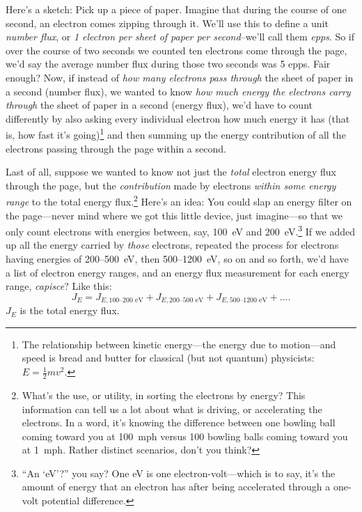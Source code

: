 Here's a sketch: Pick up a piece of paper. Imagine that during the course of one
second, an electron comes zipping through it. We'll use this to define a unit
\emph{number flux}, or \emph {1 electron per sheet of paper per second}--we'll
call them \emph{epps}. So if over the course of two seconds we counted ten
electrons come through the page, we'd say the average number flux during those
two seconds was 5 epps. Fair enough?  Now, if instead of \emph{how many
  electrons pass through} the sheet of paper in a second (number flux), we
wanted to know \emph{how much energy the electrons carry through} the sheet of
paper in a second (energy flux), we'd have to count differently by also asking
every individual electron how much energy it has (that is, how fast it's
going)\footnote{The relationship between kinetic energy---the energy due to
  motion---and speed is bread and butter for classical (but not quantum)
  physicists: $E = \frac{1}{2}m v^2.$} and then summing up the energy
contribution of all the electrons passing through the page within a second.

Last of all, suppose we wanted to know not just the \emph{total} electron energy
flux through the page, but the \emph{contribution} made by electrons
\emph{within some energy range} to the total energy flux.\footnote{What's the
  use, or utility, in sorting the electrons by energy? This information can tell
  us a lot about what is driving, or accelerating the electrons. In a word, it's
  knowing the difference between one bowling ball coming toward you at 100~mph
  versus 100 bowling balls coming toward you at 1~mph. Rather distinct
  scenarios, don't you think?} Here's an idea: You could slap an energy filter
on the page---never mind where we got this little device, just imagine---so that
we only count electrons with energies between, say, 100~eV and
200~eV.\footnote{``An `eV'?''  you say? One eV is one electron-volt---which is
  to say, it's the amount of energy that an electron has after being accelerated
  through a one-volt potential difference.} If we added up all the energy
carried by \emph{those} electrons, repeated the process for electrons having
energies of 200--500~eV, then 500--1200~eV, so on and so forth, we'd have a list
of electron energy ranges, and an energy flux measurement for each energy range,
\emph{capisce}? Like this:
\begin{equation}
  \label{ch1:eqeFlux}
  J_{E} = J_{E,\textrm{100--200 eV}} + J_{E,\textrm{200--500 eV}} + J_{E,\textrm{500--1200 eV}} + \dots .
\end{equation}
$J_E$ is the total energy flux.

